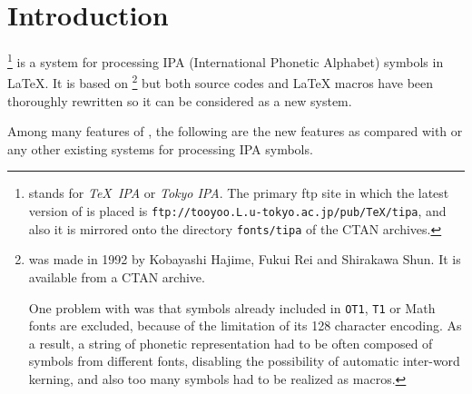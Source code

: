 %
%
%

\chapter{Introduction}

\tipa{}\footnote{\tipa{} stands for \emph{\TeX\ IPA} or \emph{Tokyo
    IPA}. The primary ftp site in which the latest version of \tipa{}
  is placed is \texttt{ftp://tooyoo.L.u-tokyo.ac.jp/pub/TeX/tipa}, and
  also it is mirrored onto the directory \texttt{fonts/tipa} of the
  CTAN archives.} is a system for processing IPA (International
Phonetic Alphabet) symbols in \LaTeX. It is based on
\tsipa{}\footnote{\tsipa{} was made in 1992 by Kobayashi Hajime, Fukui
  Rei and Shirakawa Shun. It is available from a CTAN archive.

  One problem with \tsipa{} was that symbols already included in
  \texttt{OT1}, \texttt{T1} or Math fonts are excluded, because of the
  limitation of its 128 character encoding. As a result, a string of
  phonetic representation had to be often composed of symbols from
  different fonts, disabling the possibility of automatic inter-word
  kerning, and also too many symbols had to be realized as macros.}
but both \MF{} source codes and \LaTeX{} macros have been thoroughly
rewritten so it can be considered as a new system.

Among many features of \tipa{}, the following are the new features 
as compared with \tsipa{} or any other existing systems for processing
IPA symbols.

